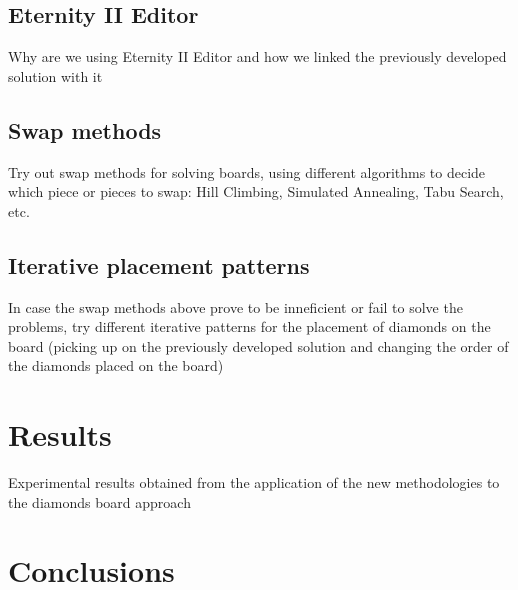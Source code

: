 \documentclass{llncs}
\begin{document}
\subsection{Eternity II Editor}

Why are we using Eternity II Editor and how we linked the previously developed solution with it

\subsection{Swap methods}

Try out swap methods for solving boards, using different algorithms to decide which piece or pieces to swap: Hill Climbing, Simulated Annealing, Tabu Search, etc.

\subsection{Iterative placement patterns}

In case the swap methods above prove to be inneficient or fail to solve the problems, try different iterative patterns for the placement of diamonds on the board (picking up on the previously developed solution and changing the order of the diamonds placed on the board)

\section{Results}

Experimental results obtained from the application of the new methodologies to the diamonds board approach

\section{Conclusions}

%
%

\end{document}
